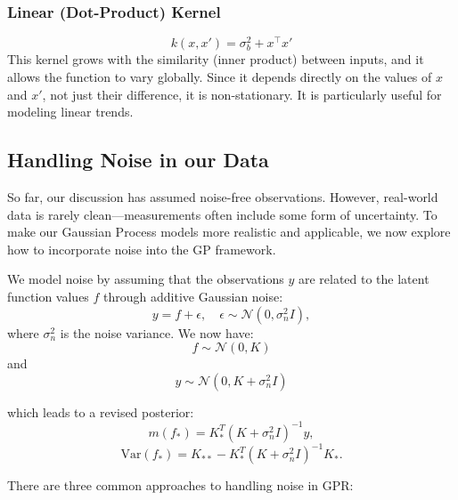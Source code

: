 \documentclass{article}
\begin{document}
\subsubsection*{Linear (Dot-Product) Kernel}
\[
k(x, x') = \sigma_b^2 + x^\top x'
\]
This kernel grows with the similarity (inner product) between inputs, and it allows the function to vary globally. Since it depends directly on the values of \( x \) and \( x' \), not just their difference, it is non-stationary. It is particularly useful for modeling linear trends.



\subsection{Handling Noise in our Data}
\label{sec: Handlingnoise}

So far, our discussion has assumed noise-free observations. However, real-world data is rarely clean—measurements often include some form of uncertainty. To make our Gaussian Process models more realistic and applicable, we now explore how to incorporate noise into the GP framework.

\bigskip

\noindent
We model noise by assuming that the observations $y$ are related to the latent function values $f$ through additive Gaussian noise:
\[
y = f + \epsilon, \quad \epsilon \sim \mathcal{N}(0, \sigma_n^2 I),
\]
where $\sigma_n^2$ is the noise variance. We now have:
\[
f \sim \mathcal{N}(0, K)
\]
and 
\begin{equation}\label{eq: 4}
y \sim \mathcal{N}(0, K+\sigma_n^2 I)
\end{equation}

\bigskip

which leads to a revised posterior:
\[
m(f_*) = K_*^T (K + \sigma_n^2 I)^{-1} y,
\]
\[
\text{Var}(f_*) = K_{**} - K_*^T (K + \sigma_n^2 I)^{-1} K_*.
\]

\bigskip

\noindent
There are three common approaches to handling noise in GPR:
\end{document}

